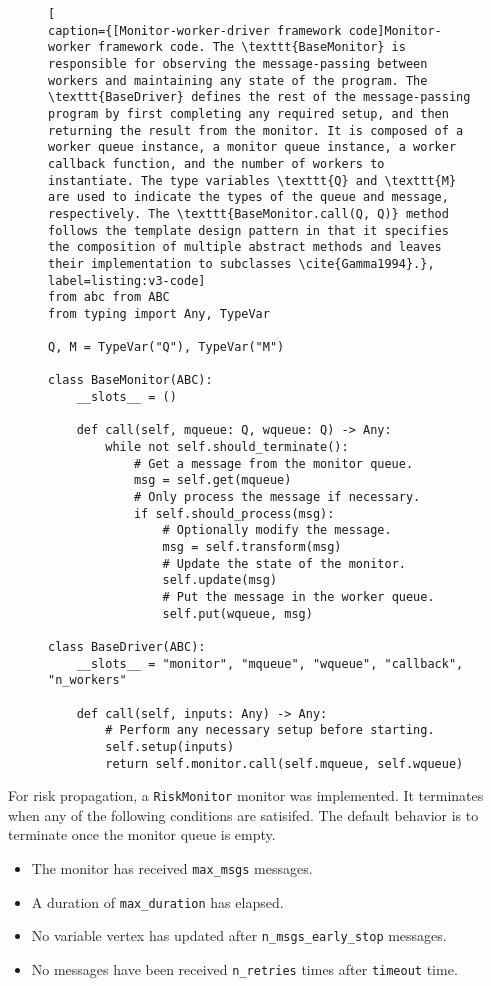\begin{figure}[htbp]
\centering
\begin{lstlisting}[
caption={[Monitor-worker-driver framework code]Monitor-worker framework code. The \texttt{BaseMonitor} is responsible for observing the message-passing between workers and maintaining any state of the program. The \texttt{BaseDriver} defines the rest of the message-passing program by first completing any required setup, and then returning the result from the monitor. It is composed of a worker queue instance, a monitor queue instance, a worker callback function, and the number of workers to instantiate. The type variables \texttt{Q} and \texttt{M} are used to indicate the types of the queue and message, respectively. The \texttt{BaseMonitor.call(Q, Q)} method follows the template design pattern in that it specifies the composition of multiple abstract methods and leaves their implementation to subclasses \cite{Gamma1994}.},
label=listing:v3-code]
from abc from ABC
from typing import Any, TypeVar

Q, M = TypeVar("Q"), TypeVar("M")

class BaseMonitor(ABC):
    __slots__ = ()

    def call(self, mqueue: Q, wqueue: Q) -> Any:
        while not self.should_terminate():
            # Get a message from the monitor queue.
            msg = self.get(mqueue)
            # Only process the message if necessary.
            if self.should_process(msg):
                # Optionally modify the message.
                msg = self.transform(msg)
                # Update the state of the monitor.
                self.update(msg)
                # Put the message in the worker queue.
                self.put(wqueue, msg)

class BaseDriver(ABC):
    __slots__ = "monitor", "mqueue", "wqueue", "callback", "n_workers"

    def call(self, inputs: Any) -> Any:
        # Perform any necessary setup before starting.
        self.setup(inputs)
        return self.monitor.call(self.mqueue, self.wqueue)
	\end{lstlisting}
\end{figure}

\par For risk propagation, a \texttt{RiskMonitor} monitor was implemented. It terminates when any of the following conditions are satisifed. The default behavior is to terminate once the monitor queue is empty.

\begin{itemize}
	\item The monitor has received \texttt{max\_msgs} messages.
	\item A duration of \texttt{max\_duration} has elapsed.
	\item No variable vertex has updated after \texttt{n\_msgs\_early\_stop} messages.
	\item No messages have been received \texttt{n\_retries} times after \texttt{timeout} time.
\end{itemize}

